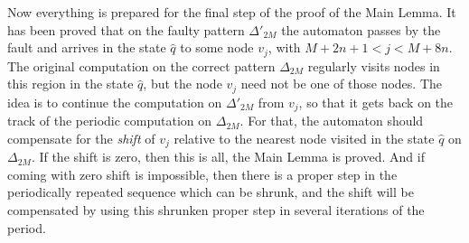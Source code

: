 \documentclass[12pt,a4paper]{article}
\theoremstyle{definition}
\begin{document}
Now everything is prepared for the final step of the proof of the Main Lemma.
It has been proved that on the faulty pattern $\Delta'_{2M}$ the automaton 
passes by the fault
and arrives in the state $\widehat{q}$ to some node $v_j$,
with $M+2n+1 < j < M+8n$.
The original computation on the correct pattern $\Delta_{2M}$
regularly visits nodes in this region in the state $\widehat{q}$,
but the node $v_j$ need not be one of those nodes.
The idea is to continue the computation on $\Delta'_{2M}$ from $v_j$,
so that it gets back on the track
of the periodic computation on $\Delta_{2M}$.
For that, the automaton should compensate for the \emph{shift} of $v_j$
relative to the nearest node visited in the state $\widehat{q}$ on $\Delta_{2M}$.
If the shift is zero, then this is all, the Main Lemma is proved.
And if coming with zero shift is impossible,
then there is a proper step in the periodically repeated sequence which can be shrunk,
and the shift will be compensated
by using this shrunken proper step in several iterations of the period.
\end{document}
